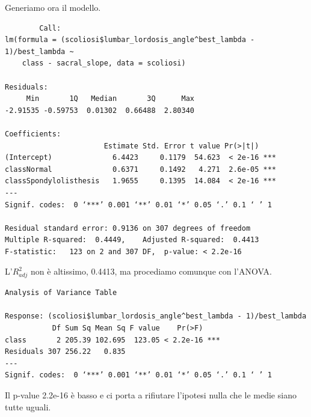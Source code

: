 \documentclass{beamer}
\begin{document}
\begin{frame}[fragile]
	Generiamo ora il modello.
	{\tiny
	\begin{verbatim}
		Call:
lm(formula = (scoliosi$lumbar_lordosis_angle^best_lambda - 1)/best_lambda ~ 
    class - sacral_slope, data = scoliosi)

Residuals:
     Min       1Q   Median       3Q      Max 
-2.91535 -0.59753  0.01302  0.66488  2.80340 

Coefficients:
                       Estimate Std. Error t value Pr(>|t|)    
(Intercept)              6.4423     0.1179  54.623  < 2e-16 ***
classNormal              0.6371     0.1492   4.271  2.6e-05 ***
classSpondylolisthesis   1.9655     0.1395  14.084  < 2e-16 ***
---
Signif. codes:  0 ‘***’ 0.001 ‘**’ 0.01 ‘*’ 0.05 ‘.’ 0.1 ‘ ’ 1

Residual standard error: 0.9136 on 307 degrees of freedom
Multiple R-squared:  0.4449,	Adjusted R-squared:  0.4413 
F-statistic:   123 on 2 and 307 DF,  p-value: < 2.2e-16
	\end{verbatim}
	}
\end{frame}

\begin{frame}[fragile]
	L'$R^{2}_{adj}$ non è altissimo, 0.4413, ma procediamo comunque con l'ANOVA.

	{\tiny
	\begin{verbatim}
Analysis of Variance Table

Response: (scoliosi$lumbar_lordosis_angle^best_lambda - 1)/best_lambda
           Df Sum Sq Mean Sq F value    Pr(>F)    
class       2 205.39 102.695  123.05 < 2.2e-16 ***
Residuals 307 256.22   0.835                      
---
Signif. codes:  0 ‘***’ 0.001 ‘**’ 0.01 ‘*’ 0.05 ‘.’ 0.1 ‘ ’ 1
	\end{verbatim}
	}

	Il p-value 2.2e-16 è basso e ci porta a rifiutare l'ipotesi nulla che le medie siano tutte uguali.
\end{frame}






%
%
%
%
\end{document}
